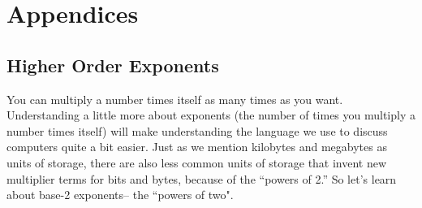 
\section{Appendices}


\subsection*{Higher Order Exponents}

You can multiply a number times itself as many times as you want. Understanding a little more about exponents (the number of times you multiply a number times itself) will make understanding the language we use to discuss computers quite a bit easier. Just as we mention kilobytes and megabytes as units of storage, there are also less common units of storage that invent new multiplier terms for bits and bytes, because of the ``powers of 2.'' So let's learn about base-2 exponents-- the ``powers of two".

\bigskip
\newcommand{\expline}[2]{
$2^{#1}$ & = & #2 
}

